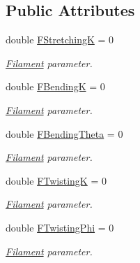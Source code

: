 \subsection*{Public Attributes}
{\bf }\par
\begin{DoxyCompactItemize}
\item 
double \hyperlink{structMechanicsParameters_ab4155933a1fc9e47f67ec6ac71efb1bf}{F\+Stretching\+K} = 0
\begin{DoxyCompactList}\small\item\em \hyperlink{classFilament}{Filament} parameter. \end{DoxyCompactList}\item 
double \hyperlink{structMechanicsParameters_aa13b8fd35ef9f6574981c411b535fb83}{F\+Bending\+K} = 0
\begin{DoxyCompactList}\small\item\em \hyperlink{classFilament}{Filament} parameter. \end{DoxyCompactList}\item 
double \hyperlink{structMechanicsParameters_a143107fd6c26d306f4d57e1b006cccb5}{F\+Bending\+Theta} = 0
\begin{DoxyCompactList}\small\item\em \hyperlink{classFilament}{Filament} parameter. \end{DoxyCompactList}\item 
double \hyperlink{structMechanicsParameters_af25f0f95ebf55f3f8f02b861bf0a9b2d}{F\+Twisting\+K} = 0
\begin{DoxyCompactList}\small\item\em \hyperlink{classFilament}{Filament} parameter. \end{DoxyCompactList}\item 
double \hyperlink{structMechanicsParameters_ae108dda4da55a3debc21abf3fbebd3f3}{F\+Twisting\+Phi} = 0
\begin{DoxyCompactList}\small\item\em \hyperlink{classFilament}{Filament} parameter. \end{DoxyCompactList}\end{DoxyCompactItemize}

